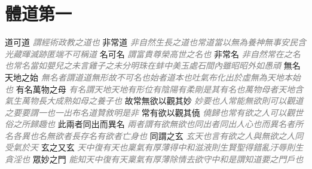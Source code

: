 \documentclass[a4paper,zihao=-4,oneside,landscape,UTF8]{ctexart}
\newcommand{\zhushi}[1]{\scriptsize{\textit{\textcolor{gray}{#1}}}\normalsize}
\begin{document}
	
	\large
	

	\section{體道第一}
	
	
	道可道
	\zhushi{謂經術政教之道也}
	非常道
	\zhushi{非自然生長之道也常道當以無為養神無事安民含光藏暉滅跡匿端不可稱道}
	名可名
	\zhushi{謂富貴尊榮高世之名也}
	非常名
	\zhushi{非自然常在之名也常名當如嬰兒之未言雞子之未分明珠在蚌中美玉處石間內雖昭昭外如愚頑}
	無名天地之始
	\zhushi{無名者謂道道無形故不可名也始者道本也吐氣布化出於虛無為天地本始也}
	有名萬物之母
	\zhushi{有名謂天地天地有形位有陰陽有柔剛是其有名也萬物母者天地含氣生萬物長大成熟如母之養子也}
	故常無欲以觀其妙
	\zhushi{妙要也人常能無欲則可以觀道之要要謂一也一出布名道贊敘明是非}
	常有欲以觀其僥
	\zhushi{僥歸也常有欲之人可以觀世俗之所歸趣也}
	此兩者同出而異名
	\zhushi{兩者謂有欲無欲也同出者同出人心也而異名者所名各異也名無欲者長存名有欲者亡身也}
	同謂之玄
	\zhushi{玄天也言有欲之人與無欲之人同受氣於天}
	玄之又玄
	\zhushi{天中復有天也稟氣有厚薄得中和滋液則生賢聖得錯亂汙辱則生貪淫也}
	眾妙之門
	\zhushi{能知天中復有天稟氣有厚薄除情去欲守中和是謂知道要之門戶也}
	
	
\end{document}
